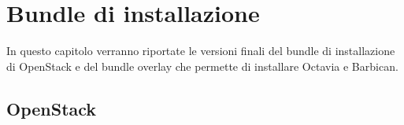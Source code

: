 


%





%



% 
%

\chapter{Bundle di installazione}
In questo capitolo verranno riportate le versioni finali del bundle di installazione di OpenStack e del bundle overlay che permette di installare Octavia e Barbican.

\section{OpenStack}\label{app:openstack_bundle}

